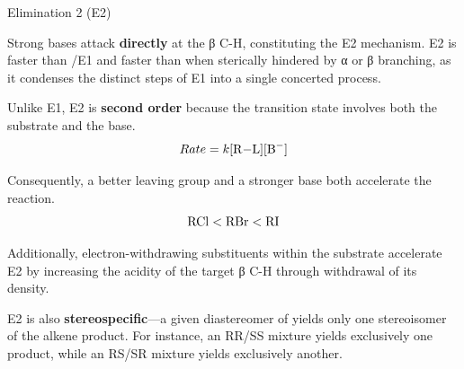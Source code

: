 \documentclass[10pt]{article}
\begin{document}
    \begin{core}{Elimination 2 (E2)}

      Strong bases attack  \textbf{directly} at the β C-H, constituting the E2 mechanism. E2 is faster than \sno/E1 and faster than \snt when sterically hindered by α or β branching, as it condenses the distinct steps of E1 into a single concerted process.


      Unlike E1, E2 is \textbf{second order} because the transition state involves both the substrate and the base.
      \[
        Rate = k[\ce{R-L}][\ce{B-}]
      \]

      Consequently, a better leaving group and a stronger base both accelerate the reaction.
      \[
        \ce{RCl} < \ce{RBr} < \ce{RI}
      \]

      Additionally, electron-withdrawing substituents within the substrate accelerate E2 by increasing the acidity of the target β C-H through withdrawal of its  density.


      E2 is also \textbf{stereospecific}---a given diastereomer of  yields only one stereoisomer of the alkene product. For instance, an RR/SS mixture yields exclusively one product, while an RS/SR mixture yields exclusively another.


\end{core}
\end{document}
